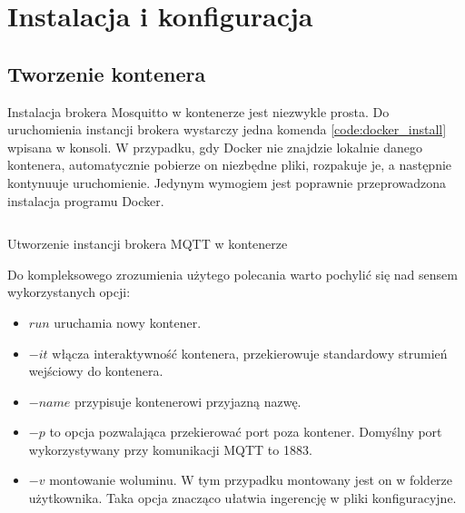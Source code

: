         
    \section{Instalacja i konfiguracja}
        \subsection{Tworzenie kontenera}
            Instalacja brokera Mosquitto w kontenerze jest niezwykle prosta. Do uruchomienia instancji brokera wystarczy jedna komenda \ref{code:docker_install} wpisana w konsoli. W przypadku, gdy Docker nie znajdzie lokalnie danego kontenera, automatycznie pobierze on niezbędne pliki, rozpakuje je, a następnie kontynuuje uruchomienie. Jedynym wymogiem jest poprawnie przeprowadzona instalacja programu Docker.
            
            \begin{kod}
                \inputminted[lastline=2]{sh}{mqtt/listings/docker.sh}
                \caption{Utworzenie instancji brokera MQTT w kontenerze}
                \label{code:docker_install}
                \vspace{2em}
            \end{kod}
            
            Do kompleksowego zrozumienia użytego polecania warto pochylić się nad sensem wykorzystanych opcji:
            
            \begin{itemize}
                \item $run$ uruchamia nowy kontener.
                
                \item $-it$ włącza interaktywność kontenera, przekierowuje standardowy strumień wejściowy do kontenera.
                
                \item $-name$ przypisuje kontenerowi przyjazną nazwę.
                
                \item $-p$ to opcja pozwalająca przekierować port poza kontener. Domyślny port wykorzystywany przy komunikacji MQTT to 1883.
                
                \item $-v$ montowanie woluminu. W tym przypadku montowany jest on w folderze użytkownika. Taka opcja znacząco ułatwia ingerencję w pliki konfiguracyjne.
                
            \end{itemize}
            
